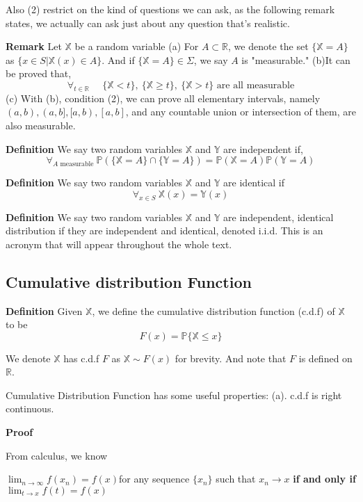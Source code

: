 \documentclass[a4paper,12pt]{article}
\begin{document}
Also (2) restrict on the kind of questions we can ask, as the following remark states, we actually can ask just about any question that's realistic. 

\textbf{Remark} 
Let $\mathbb{X}$ be a random variable 
(a) For $A \subset \mathbb{R}$, we denote the set $\{ \mathbb{X} = A \}$ as $\{ x \in S | \mathbb{X}(x) \in A \}$. And if $\{ \mathbb{X} = A \}\in\Sigma$, we say $A$ is "measurable." 
(b)It can be proved that, 
$$\forall_{t\in \mathbb{R}} \ \ \ \ \ \ \{\mathbb{X} < t \},\ \{\mathbb{X} \geq t \},\ \{\mathbb{X} > t \} \text{ are all measurable}$$ 
(c) With (b), condition (2), we can prove all elementary intervals, namely $(a, b), (a, b], [a, b), [a, b]$, and any countable union or intersection of them, are also measurable. 

\textbf{Definition} We say two random variables $\mathbb{X}$ and $\mathbb{Y}$ are independent if, $$\forall_{A\text{ measurable } }\mathbb{P}( \{\mathbb{X} = A\} \cap \{\mathbb{Y} = A\} ) = \mathbb{P}(\mathbb{X} = A)\mathbb{P}(\mathbb{Y} = A)$$

\textbf{Definition} We say two random variables $\mathbb{X}$ and $\mathbb{Y}$ are identical if $$\forall_{x\in S}\ \mathbb{X}(x) = \mathbb{Y}(x)$$

\textbf{Definition} We say two random variables $\mathbb{X}$ and $\mathbb{Y}$ are independent, identical distribution if they are independent and identical, denoted i.i.d. This is an acronym that will appear throughout the whole text.

\subsection{Cumulative distribution Function}

\textbf{Definition} Given $\mathbb{X}$, we define the cumulative distribution function (c.d.f) of $\mathbb{X}$ to be $$F(x) = \mathbb{P}\{\mathbb{X} \leq x\}$$

We denote $\mathbb{X}$ has c.d.f $F$ as $\mathbb{X} \sim F(x)$ for brevity. And note that $F$ is defined on $\mathbb{R}$.

Cumulative Distribution Function has some useful properties: 
(a). c.d.f is right continuous.

\textbf{Proof}

From calculus, we know
\begin{center}
 $\lim_{n\to\infty}f(x_n)=f(x) $for any sequence $\{x_n\}$ such that $x_n \to x$  
\textbf{if and only if} 
 $\lim_{t\to x}f(t)=f(x)$
\end{center}
 
\end{document}
